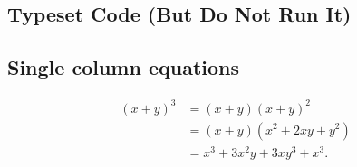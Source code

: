 \documentclass[letterpaper,9pt,twocolumn,twoside,]{pinp}
\begin{document}
\hypertarget{typeset-code-but-do-not-run-it}{%
\subsection{Typeset Code (But Do Not Run
It)}\label{typeset-code-but-do-not-run-it}}

\hypertarget{single-column-equations}{%
\subsection{Single column equations}\label{single-column-equations}}

\begin{equation}
  \begin{aligned}
(x+y)^3&=(x+y)(x+y)^2\\
       &=(x+y)(x^2+2xy+y^2) \\
       &=x^3+3x^2y+3xy^3+x^3. 
       \label{eqn:example} 
  \end{aligned}
\end{equation}

\showacknow




\end{document}

